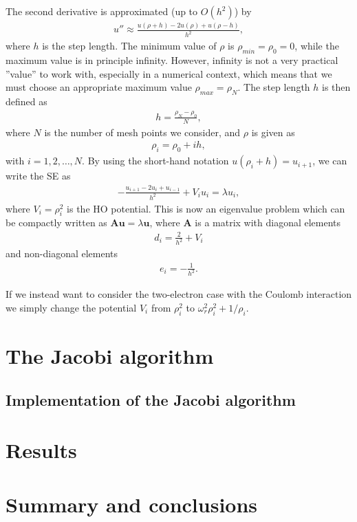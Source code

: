 \documentclass[12pt, a4paper]{article}
\begin{document}
The second derivative is approximated (up to $O(h^2)$) by 
\begin{align*}
u'' \approx \frac{u(\rho + h) - 2u(\rho) + u(\rho - h)}{h^2},  
\end{align*}
where $h$ is the step length. The minimum value of $\rho$ is $\rho_{min} = \rho_0 = 0$, while the 
maximum value is in principle infinity. However, infinity is not a very practical ''value'' to work with,
especially in a numerical context, which means that we must choose an appropriate maximum value 
$\rho_{max} = \rho_N$. The step length $h$ is then defined as 
\begin{align*}
h = \frac{\rho_N - \rho_0}{N}, 
\end{align*} 
where $N$ is the number of mesh points we consider, and $\rho$ is given as 
\begin{align*}
\rho_i = \rho_0 + ih, 
\end{align*}
with $i = 1,2,\dots,N$. By using the short-hand notation $u(\rho_i + h) = u_{i+1}$, we can write the 
SE as 
\begin{align}
- \frac{u_{i+1} - 2u_i + u_{i-1}}{h^2} + V_iu_i = \lambda u_i, 
\end{align}
where $V_i = \rho_i^2$ is the HO potential. This is now an eigenvalue problem which can be compactly 
written as $\mathbf{Au} = \lambda\mathbf{u}$, where $\mathbf{A}$ is a matrix with diagonal elements 
\begin{align*}
d_i = \frac{2}{h^2} + V_i
\end{align*}
and non-diagonal elements 
\begin{align*}
e_i = -\frac{1}{h^2}. 
\end{align*} 

If we instead want to consider the two-electron case with the Coulomb interaction we simply change 
the potential $V_i$ from $\rho_i^2$ to $\omega_r^2\rho_i^2 + 1/\rho_i$. 


\section{The Jacobi algorithm}



\subsection{Implementation of the Jacobi algorithm}

\section{Results}

\section{Summary and conclusions}
\end{document}
